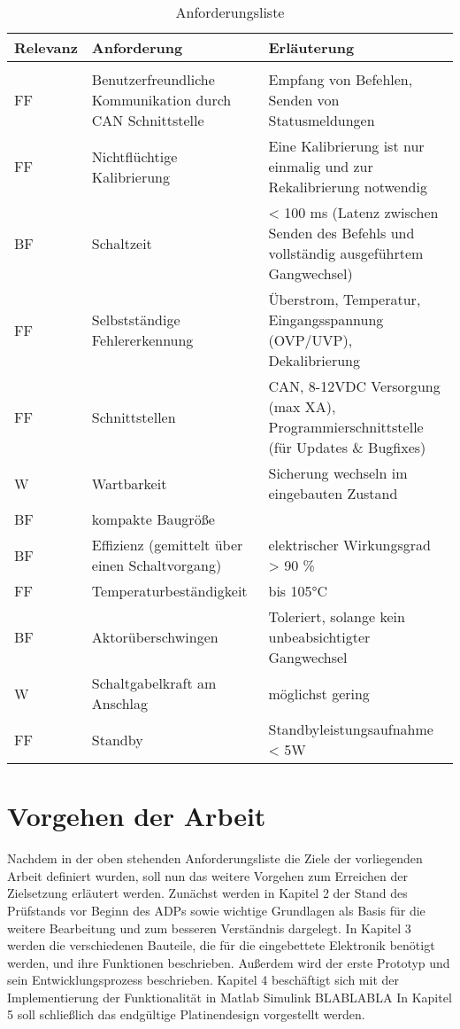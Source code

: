 \begin{table}[h]
	\centering
		\begin{tabular}{l|p{7cm}|p{7cm}}
			\textbf{Relevanz} & \textbf{Anforderung} & \textbf{Erläuterung} \\ \hline
			& &\\
			FF & Benutzerfreundliche Kommunikation durch CAN Schnittstelle & Empfang von Befehlen, Senden von Statusmeldungen \\
			FF & Nichtflüchtige Kalibrierung & Eine Kalibrierung ist nur einmalig und zur Rekalibrierung notwendig \\
			BF & Schaltzeit & < 100 ms (Latenz zwischen Senden des Befehls und vollständig ausgeführtem Gangwechsel) \\
			FF & Selbstständige Fehlererkennung & Überstrom, Temperatur, Eingangsspannung (OVP/UVP), Dekalibrierung \\
			FF & Schnittstellen & CAN, 8-12VDC Versorgung (max XA), Programmierschnittstelle (für Updates \& Bugfixes) \\
			W & Wartbarkeit & Sicherung wechseln im eingebauten Zustand \\
			BF & kompakte Baugröße & \\ 
			BF & Effizienz (gemittelt über einen Schaltvorgang) & elektrischer Wirkungsgrad > 90 \% \\
			FF & Temperaturbeständigkeit & bis 105°C \\
			BF & Aktorüberschwingen & Toleriert, solange kein unbeabsichtigter Gangwechsel \\
			W & Schaltgabelkraft am Anschlag & möglichst gering \\
			FF & Standby & Standbyleistungsaufnahme < 5W \\
		\end{tabular}
	\caption{Anforderungsliste}
	\label{tab:Anforderungsliste}
\end{table}

\section{Vorgehen der Arbeit}
Nachdem in der oben stehenden Anforderungsliste die Ziele der vorliegenden Arbeit definiert wurden, soll nun das weitere Vorgehen zum Erreichen der Zielsetzung erläutert werden. Zunächst werden in Kapitel 2 der Stand des Prüfstands vor Beginn des ADPs sowie wichtige Grundlagen als Basis für die weitere Bearbeitung und zum besseren Verständnis dargelegt. In Kapitel 3 werden die verschiedenen Bauteile, die für die eingebettete Elektronik benötigt werden, und ihre Funktionen beschrieben. Außerdem wird der erste Prototyp und sein Entwicklungsprozess beschrieben. Kapitel 4 beschäftigt sich mit der Implementierung der Funktionalität in Matlab Simulink BLABLABLA
In Kapitel 5 soll schließlich das endgültige Platinendesign vorgestellt werden.